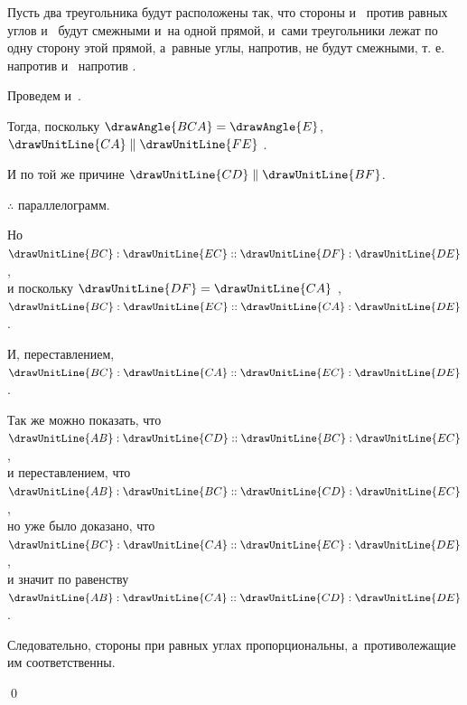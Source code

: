 \documentclass[letters,booklanguage=russian]{byrnebook}
\begin{document}
Пусть два треугольника будут расположены так, что стороны  и~ против равных углов  и~  будут смежными и~на одной прямой, и~сами треугольники лежат по одну сторону этой прямой, а~равные углы, напротив, не будут смежными, т. е.  напротив  и~ напротив .

\begin{center}
Проведем  и~.

Тогда, поскольку $\drawAngle{BCA} = \drawAngle{E}$, $\drawUnitLine{CA} \parallel \drawUnitLine{FE}$ .

И по той же причине $\drawUnitLine{CD} \parallel \drawUnitLine{BF}$.

$\therefore$
параллелограмм.

Но $\drawUnitLine{BC} : \drawUnitLine{EC} :: \drawUnitLine{DF} : \drawUnitLine{DE}$ ,\\
и поскольку $\drawUnitLine{DF} = \drawUnitLine{CA}$ ,\\
$\drawUnitLine{BC} : \drawUnitLine{EC} :: \drawUnitLine{CA} : \drawUnitLine{DE}$.

И, переставлением, $\drawUnitLine{BC} : \drawUnitLine{CA} :: \drawUnitLine{EC} : \drawUnitLine{DE}$ .

Так же можно показать, что\\
$\drawUnitLine{AB} : \drawUnitLine{CD} :: \drawUnitLine{BC} : \drawUnitLine{EC}$,\\
и переставлением, что\\
$\drawUnitLine{AB} : \drawUnitLine{BC} :: \drawUnitLine{CD} : \drawUnitLine{EC}$,\\
но уже было доказано, что\\
$\drawUnitLine{BC} : \drawUnitLine{CA} :: \drawUnitLine{EC} : \drawUnitLine{DE}$,\\
и значит по равенству\\
$\drawUnitLine{AB} : \drawUnitLine{CA} :: \drawUnitLine{CD} : \drawUnitLine{DE}$ .
\end{center}

Следовательно, стороны при равных углах пропорциональны, а~противолежащие им соответственны.

\qed
\end{document}
